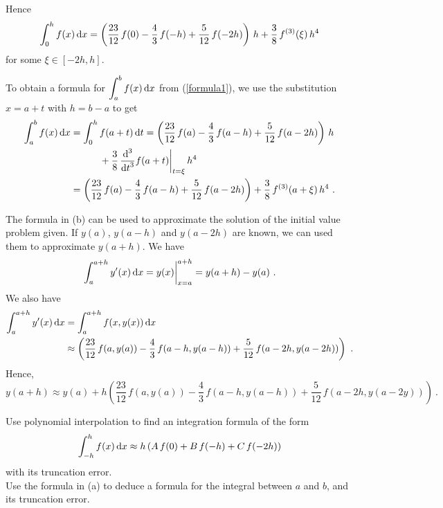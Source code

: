{Hence
\begin{equation}\label{formula1}
\int_0^h f(x) \dx{x}
= \left(\frac{23}{12}\,f(0) - \frac{4}{3}\,f(-h) +
\frac{5}{12}\,f(-2h)\right)\,h + \frac{3}{8}\,f^{(3)}(\xi)\,h^4
\end{equation}
for some $\xi \in [-2h,h]$.

 To obtain a formula for $\DS \int_a^b f(x)\dx{x}$ from
(\ref{formula1}), we use the substitution $x= a + t$ with $h=b-a$ to get
\begin{align*}
\int_a^b f(x)\dx{x} &= \int_0^h f(a+t) \dx{t}
= \left(\frac{23}{12}\,f(a) - \frac{4}{3}\,f(a-h) +
\frac{5}{12}\,f(a-2h)\right)\,h \\
&\qquad \quad + \frac{3}{8}\,\dfdxn{f(a+t)}{t}{3}\bigg|_{t=\xi} \, h^4 \\
&= \left(\frac{23}{12}\,f(a) - \frac{4}{3}\,f(a-h) +
\frac{5}{12}\,f(a-2h)\right)
+\frac{3}{8}\,f^{(3)}(a+\xi)\,h^4 \ .
\end{align*}

 The formula in (b) can be used to approximate the solution of
the initial value problem given.  If $y(a)$, $y(a-h)$ and
$y(a-2h)$ are known, we can used them to approximate $y(a+h)$.
We have
\[
\int_{a}^{a+h} y'(x) \dx{x} = y(x)\bigg|_{x=a}^{a+h}
= y(a+h) - y(a) \ .
\]
We also have
\begin{align*}
\int_{a}^{a+h} y'(x) \dx{x} &= \int_{a}^{a+h} f(x,y(x)) \dx{x} \\
&\approx \left(\frac{23}{12}\,f(a,y(a)) - \frac{4}{3}\,f(a-h,y(a-h)) +
\frac{5}{12}\,f(a-2h,y(a-2h))\right) \ .
\end{align*}
Hence,
\[
y(a+h) \approx y(a) + h\left(\frac{23}{12}\,f(a,y(a)) -
  \frac{4}{3}\,f(a-h,y(a-h)) + \frac{5}{12}\,f(a-2h,y(a-2y))\right) \ .
\]
}

\begin{question}
 Use polynomial interpolation to find an integration formula
of the form
\[
\int_{-h}^h f(x)\dx{x} \approx h\left(A\,f(0)+B\,f(-h)+C\,f(-2h)\right)
\]
with its truncation error.\\
 Use the formula in (a) to deduce a formula for the integral
between $a$ and $b$, and its truncation error.
\end{question}

